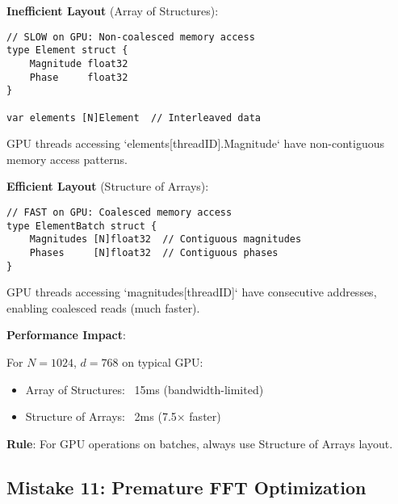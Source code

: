 \begin{warning}
\textbf{Inefficient Layout} (Array of Structures):

\begin{lstlisting}[style=golang]
// SLOW on GPU: Non-coalesced memory access
type Element struct {
    Magnitude float32
    Phase     float32
}

var elements [N]Element  // Interleaved data
\end{lstlisting}

GPU threads accessing `elements[threadID].Magnitude` have non-contiguous memory access patterns.

\textbf{Efficient Layout} (Structure of Arrays):

\begin{lstlisting}[style=golang]
// FAST on GPU: Coalesced memory access
type ElementBatch struct {
    Magnitudes [N]float32  // Contiguous magnitudes
    Phases     [N]float32  // Contiguous phases
}
\end{lstlisting}

GPU threads accessing `magnitudes[threadID]` have consecutive addresses, enabling coalesced reads (much faster).

\textbf{Performance Impact}:

For $N=1024$, $d=768$ on typical GPU:
\begin{itemize}
\item Array of Structures: ~15ms (bandwidth-limited)
\item Structure of Arrays: ~2ms (7.5× faster)
\end{itemize}

\textbf{Rule}: For GPU operations on batches, always use Structure of Arrays layout.
\end{warning}

\subsection{Mistake 11: Premature FFT Optimization}

